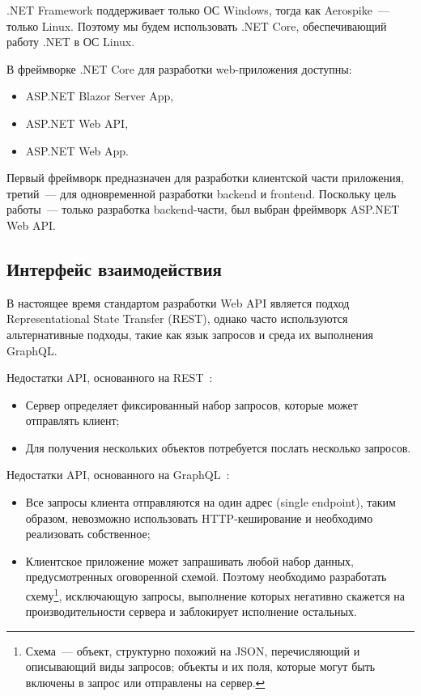 \documentclass[14pt]{matmex-diploma-custom}
\begin{document}
\sloppy
.NET Framework поддерживает только ОС Windows, тогда как Aerospike~--- только Linux. Поэтому мы будем использовать .NET Core, обеспечивающий работу .NET в ОС Linux.

В фреймворке .NET Core для разработки web-приложения доступны:
\begin{itemize}
    \item ASP.NET Blazor Server App,
    \item ASP.NET Web API,
    \item ASP.NET Web App.
\end{itemize}
Первый фреймворк предназначен для разработки клиентской части приложения, третий~--- для одновременной разработки backend и frontend. Поскольку цель работы~--- только разработка backend-части, был выбран фреймворк ASP.NET Web API.

\subsection{Интерфейс взаимодействия}
В настоящее время стандартом разработки Web API является подход Representational State Transfer (REST), однако часто используются альтернативные подходы, такие как язык запросов и среда их выполнения GraphQL.

Недостатки API, основанного на REST~\cite{graphql:rest}:
\begin{itemize}
    \item Сервер определяет фиксированный набор запросов, которые может отправлять клиент;
    \item Для получения нескольких объектов потребуется послать несколько запросов.
\end{itemize}
Недостатки API, основанного на GraphQL~\cite{graphql:rest}:
\begin{itemize}
    \item Все запросы клиента отправляются на один адрес (single endpoint), таким образом, невозможно использовать HTTP-кеширование и необходимо реализовать собственное;
    \item Клиентское приложение может запрашивать любой набор данных, предусмотренных оговоренной схемой. Поэтому необходимо разработать схему\footnote{Схема~--- объект, структурно похожий на JSON, перечисляющий и описывающий виды запросов; объекты и их поля, которые могут быть включены в запрос или отправлены на сервер.}, исключающую запросы, выполнение которых негативно скажется на производительности сервера и заблокирует исполнение остальных.
\end{itemize}
\end{document}
